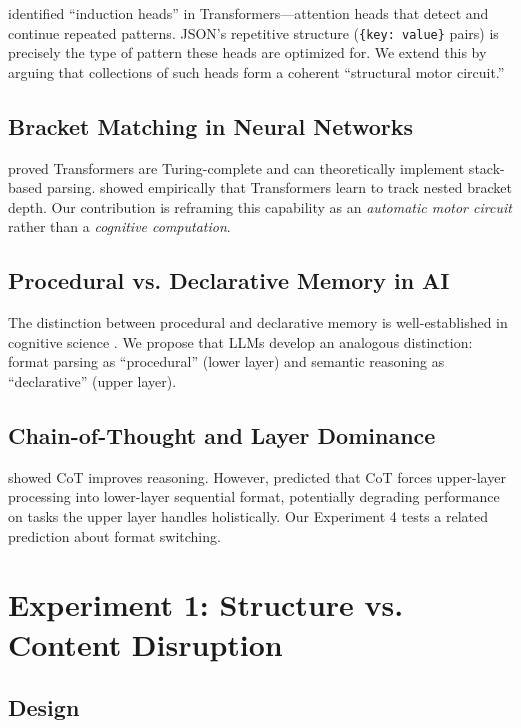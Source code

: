 \documentclass[11pt,a4paper]{article}
\begin{document}
\citet{olsson2022context} identified ``induction heads'' in Transformers---attention heads that detect and continue repeated patterns. JSON's repetitive structure (\texttt{\{key: value\}} pairs) is precisely the type of pattern these heads are optimized for. We extend this by arguing that collections of such heads form a coherent ``structural motor circuit.''

\subsection{Bracket Matching in Neural Networks}

\citet{yun2020transformers} proved Transformers are Turing-complete and can theoretically implement stack-based parsing. \citet{ebrahimi2020bracket} showed empirically that Transformers learn to track nested bracket depth. Our contribution is reframing this capability as an \textit{automatic motor circuit} rather than a \textit{cognitive computation}.

\subsection{Procedural vs. Declarative Memory in AI}

The distinction between procedural and declarative memory is well-established in cognitive science \citep{squire1992memory}. We propose that LLMs develop an analogous distinction: format parsing as ``procedural'' (lower layer) and semantic reasoning as ``declarative'' (upper layer).

\subsection{Chain-of-Thought and Layer Dominance}

\citet{wei2022chain} showed CoT improves reasoning. However, \citet{jin2026dual} predicted that CoT forces upper-layer processing into lower-layer sequential format, potentially degrading performance on tasks the upper layer handles holistically. Our Experiment 4 tests a related prediction about format switching.

\section{Experiment 1: Structure vs. Content Disruption}

\subsection{Design}
\end{document}
